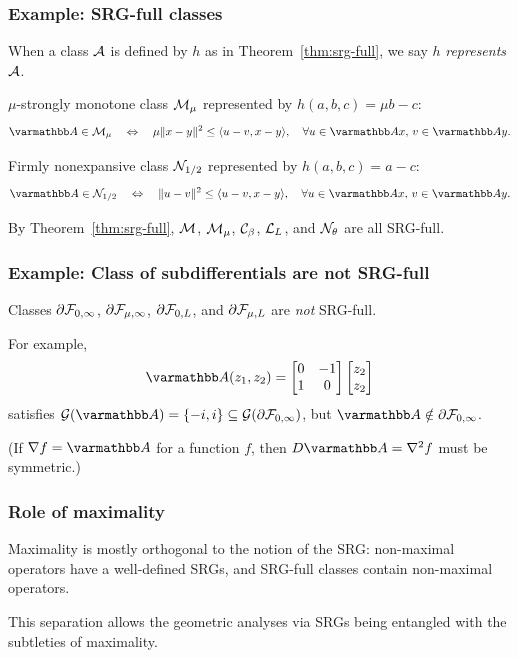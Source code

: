 \documentclass[10pt,mathserif]{beamer}
\begin{document}
\begin{frame}
\frametitle{Example: SRG-full classes} 
When a class ${\mathcal{A}}$ is defined by $h$ as in  Theorem~\ref{thm:srg-full}, we say $h$ \emph{represents} ${\mathcal{A}}$.
\vspace{0.2in}

$\mu$-strongly monotone class ${\mathcal{M}}_\mu$ represented by $h(a,b,c)=\mu b-c$:
\[
\opA\in \cM_{\mu}
\quad\Leftrightarrow\quad
\mu\|x-y\|^2\le \langle u-v,x-y\rangle,\quad\forall u\in \opA x,\,v\in \opA y.
\]
\vspace{0.2in}

Firmly nonexpansive class ${\mathcal{N}}_{1/2}$ represented by $h(a,b,c)=a-c$:
\[
\opA\in \cN_{1/2}
\quad\Leftrightarrow\quad
\|u-v\|^2\le \langle u-v,x-y\rangle,\quad\forall u\in \opA x,\,v\in \opA y.
\]

\vspace{0.2in}
By Theorem~\ref{thm:srg-full}, ${\mathcal{M}}$, ${\mathcal{M}}_\mu$, ${\mathcal{C}}_\beta$, ${\mathcal{L}}_L$, and ${\mathcal{N}}_\theta$ are all SRG-full.

\end{frame}



\begin{frame}
\frametitle{Example: Class of subdifferentials are not SRG-full}
Classes $\partial {\mathcal{F}}_{0,\infty}$, $\partial {\mathcal{F}}_{\mu,\infty}$, $\partial {\mathcal{F}}_{0,L}$, and $\partial {\mathcal{F}}_{\mu,L}$ are \emph{not} SRG-full.

\vspace{0.2in}

For example, 
\[
\opA(z_1,z_2)=
\begin{bmatrix}
0&-1\\
1&0
\end{bmatrix}
\begin{bmatrix}
z_2\\z_2
\end{bmatrix}
\]
satisfies $\cG(\opA)=\{-i,i\}\subseteq \cG( \partial \cF_{0,\infty})$, but
$\opA\notin \partial \cF_{0,\infty}$.

\vspace{0.2in}
(If $\nabla f=\opA$ for a function $f$, then $D\opA=\nabla^2f$ must be symmetric.)
\end{frame}

\begin{frame}
\frametitle{Role of maximality}
Maximality is mostly orthogonal to the notion of the SRG:
non-maximal operators have a well-defined SRGs, and SRG-full classes contain non-maximal operators.
\vspace{0.2in}

This separation allows the geometric analyses via SRGs being entangled with the subtleties of maximality.
\end{frame}
\end{document}
